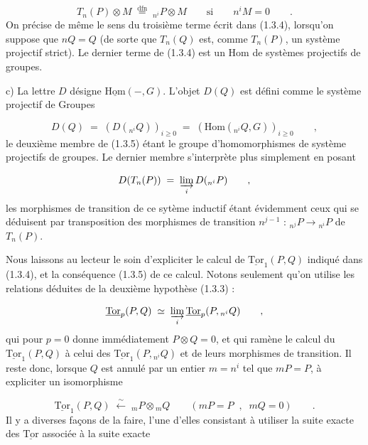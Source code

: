 \begin{equation*}
T_n(P) \otimes M \;\overset{\mathrm{dfn}}{=}\; {}_{n^i}P \otimes M \qquad \text{si} \qquad n^i M = 0 \qquad .
\end{equation*}
On précise de même le sens du troisième terme écrit dans (1.3.4), lorsqu'on suppose que $nQ = Q$ (de sorte que $T_n(Q)$ est, comme $T_n(P)$, un système projectif strict). Le dernier terme de (1.3.4) est un $\mathrm{Hom}$ de systèmes projectifs de groupes.

c)  La lettre $D$ désigne $\underline{\mathrm{Hom}}(-,G)$. L'objet $D(Q)$ est défini comme le système projectif de Groupes

\begin{equation*}
D(Q) \;=\; (D({}_{n^i}Q))_{i \geq 0} \;=\; (\mathrm{Hom}({}_{n^i}Q,G))_{i \geq 0} \qquad ,
\end{equation*}
le deuxième membre de (1.3.5) étant le groupe d'homomorphismes de système projectifs de groupes. Le dernier membre s'interprète plus simplement en posant

\begin{equation*}
D(T_n(P)) \;=\; \varinjlim_i D({}_{n^i}P) \qquad ,
\end{equation*}
les morphismes de transition de ce sytème inductif étant évidemment ceux qui se déduisent par transposition des morphismes de transition
$n^{j-1}$ : ${}_{n^j}P \longrightarrow {}_{n^i}P$ de $T_n(P)$.

Nous laissons au lecteur le soin d'expliciter le calcul de $\underline{\mathrm{Tor}}_1(P,Q)$ indiqué dans (1.3.4), et la conséquence (1.3.5) de ce calcul. Notons seulement qu'on utilise les relations déduites de la deuxième hypothèse (1.3.3) :

\begin{equation*}
\underline{\mathrm{Tor}}_p(P,Q) \;\simeq\; \varinjlim_{i} \underline{\mathrm{Tor}}_p(P, {}_{n^i}Q) \qquad ,
\end{equation*}
qui pour $p=0$ donne immédiatement $P \otimes Q = 0$, et qui ramène le calcul du $\underline{\mathrm{Tor}}_1(P,Q)$ à celui des $\underline{\mathrm{Tor}}_1(P, {}_{n^i}Q)$ et de leurs morphismes de transition. Il reste donc, lorsque $Q$ est annulé par un entier $m = n^i$ tel que $mP = P$, à expliciter un isomorphisme

\begin{equation}\tag{1.3.6}
\underline{\mathrm{Tor}}_1(P,Q) \;\stackrel{\sim}{\longleftarrow}\; {}_mP \otimes {}_mQ \qquad (mP=P \;\; , \;\; mQ = 0) \qquad .
\end{equation}
Il y a diverses façons de la faire, l'une d'elles consistant à utiliser la suite exacte des $\underline{\mathrm{Tor}}$ associée à la suite exacte

